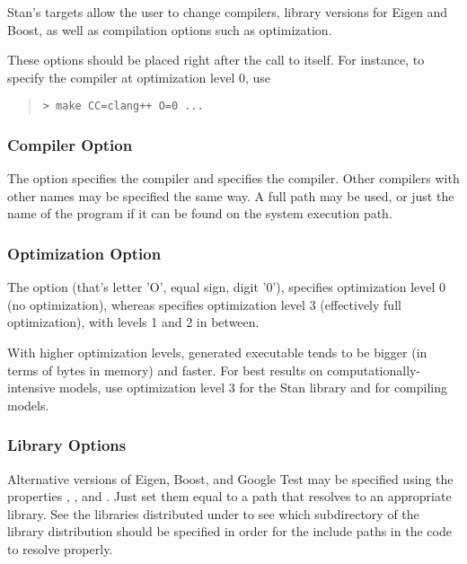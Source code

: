 Stan's  targets allow the user to change compilers,
library versions for Eigen and Boost, as well as compilation options
such as optimization.

These options should be placed right after the call to 
itself.  For instance, to specify the  compiler at
optimization level 0, use
%
\begin{quote}
\begin{Verbatim}[fontshape=sl]
> make CC=clang++ O=0 ...
\end{Verbatim}
\end{quote}


\subsubsection{Compiler Option}

The option  specifies the  compiler and
 specifies the  compiler.  Other
compilers with other names may be specified the same way.  A full path
may be used, or just the name of the program if it can be found on the
system execution path.  

\subsubsection{Optimization Option}

The option  (that's letter 'O', equal sign, digit '0'),
specifies optimization level 0 (no optimization), whereas 
specifies optimization level 3 (effectively full optimization), with
levels 1 and 2 in between.

With higher optimization levels, generated executable tends to be bigger
(in terms of bytes in memory) and faster.  For best results on
computationally-intensive models, use optimization level 3 for the
Stan library and for compiling models.

\subsubsection{Library Options}

Alternative versions of Eigen, Boost, and Google Test may be specified
using the properties , , and .
Just set them equal to a path that resolves to an appropriate library.
See the libraries distributed under  to see which
subdirectory of the library distribution should be specified in order
for the include paths in the \Cpp code to resolve properly.


